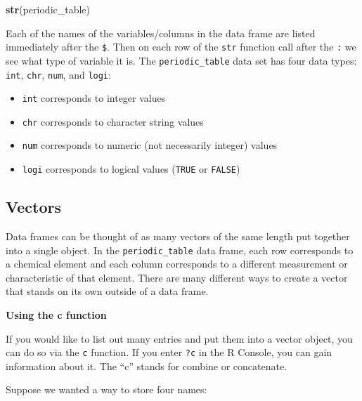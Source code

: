 \documentclass[]{tufte-book}
\newenvironment{Shaded}{\begin{snugshade}}{\end{snugshade}}
\newcommand{\FunctionTok}[1]{\textcolor[rgb]{0.13,0.29,0.53}{\textbf{#1}}}
\newcommand{\NormalTok}[1]{#1}
\providecommand{\tightlist}{%
  \setlength{\itemsep}{0pt}\setlength{\parskip}{0pt}}
\begin{document}
\begin{Shaded}
\begin{Highlighting}[]
\FunctionTok{str}\NormalTok{(periodic\_table)}
\end{Highlighting}
\end{Shaded}

Each of the names of the variables/columns in the data frame are listed immediately after the \texttt{\$}. Then on each row of the \texttt{str} function call after the \texttt{:} we see what type of variable it is. The \texttt{periodic\_table} data set has four data types: \texttt{int}, \texttt{chr}, \texttt{num}, and \texttt{logi}:

\begin{itemize}
\tightlist
\item
  \texttt{int} corresponds to integer values
\item
  \texttt{chr} corresponds to character string values
\item
  \texttt{num} corresponds to numeric (not necessarily integer) values
\item
  \texttt{logi} corresponds to logical values (\texttt{TRUE} or \texttt{FALSE})
\end{itemize}

\subsection{Vectors}\label{vectors}

Data frames can be thought of as many vectors of the same length put together into a single object. In the \texttt{periodic\_table} data frame, each row corresponds to a chemical element and each column corresponds to a different measurement or characteristic of that element. There are many different ways to create a vector that stands on its own outside of a data frame. \newline\vspace*{0.1in}

\vspace*{0.2in}

\noindent\textbf{Using the c function}\vspace*{0.1in}

If you would like to list out many entries and put them into a vector object, you can do so via the \texttt{c} function. If you enter \texttt{?c} in the R Console, you can gain information about it. The ``c'' stands for combine or concatenate.

Suppose we wanted a way to store four names:
\end{document}
